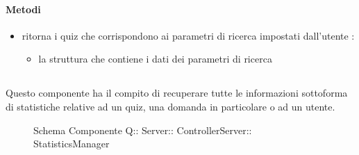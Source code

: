 \paragraph{Metodi}
\begin{itemize}
\item {}
\newline
ritorna i quiz che corrispondono ai parametri di ricerca impostati dall'utente
\newline
{} :
\begin{itemize}
\item {}
\newline
la struttura che contiene i dati dei parametri di ricerca
\end{itemize}
\end{itemize}
\subsection{}
Questo componente ha il compito di recuperare tutte le informazioni sottoforma di statistiche relative ad un quiz, una domanda in particolare o ad un utente.
\begin{figure}[H]
\centering
\noindent{}
\caption[Schema Componente Quizzipedia::Server::ControllerServer::StatisticsManager]{Schema Componente Q:: Server:: ControllerServer:: StatisticsManager}
\end{figure}
